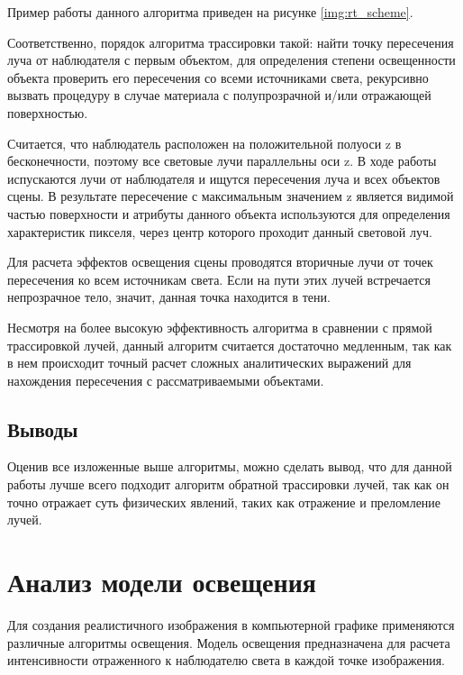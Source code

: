 Пример работы данного алгоритма приведен на рисунке \ref{img:rt_scheme}.


Соответственно, порядок алгоритма трассировки такой: найти точку пересечения луча от наблюдателя с первым объектом, для определения степени освещенности объекта проверить его пересечения со всеми источниками света, рекурсивно вызвать процедуру в случае материала с полупрозрачной и/или отражающей поверхностью.

Считается, что наблюдатель расположен на положительной полуоси z в бесконечности, поэтому все световые лучи параллельны оси z. В ходе работы испускаются лучи от наблюдателя и ищутся пересечения луча и всех объектов сцены. В результате пересечение с максимальным значением z является видимой частью поверхности и атрибуты данного объекта используются для
определения характеристик пикселя, через центр которого проходит данный световой луч.

Для расчета эффектов освещения сцены проводятся вторичные лучи от точек пересечения ко всем источникам света. Если на пути этих лучей встречается непрозрачное тело, значит, данная точка находится в тени.

Несмотря на более высокую эффективность алгоритма в сравнении с прямой трассировкой лучей, данный алгоритм считается достаточно медленным, так как в нем происходит точный расчет сложных аналитических выражений для нахождения пересечения с рассматриваемыми объектами.

\subsection{Выводы}

Оценив все изложенные выше алгоритмы, можно сделать вывод, что для данной работы лучше всего подходит алгоритм обратной трассировки лучей, так как он точно отражает суть физических явлений, таких как отражение и преломление лучей.

\section{Анализ модели освещения}

Для создания реалистичного изображения в компьютерной графике применяются различные алгоритмы освещения. Модель освещения предназначена для расчета интенсивности отраженного к наблюдателю света в каждой точке изображения.

